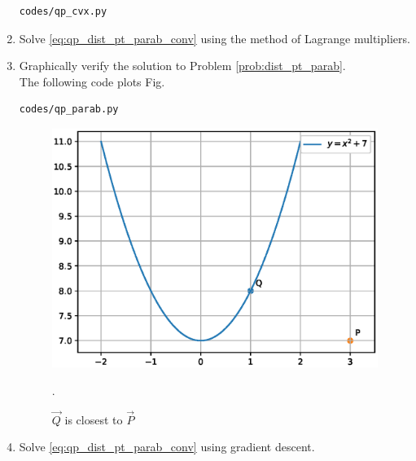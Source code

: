 \begin{enumerate}[label=\arabic*.,ref=\thesection.\theenumi]
\begin{lstlisting}
codes/qp_cvx.py
\end{lstlisting}

\item Solve \eqref{eq:qp_dist_pt_parab_conv} using the method of Lagrange multipliers.
\item Graphically verify the solution to Problem \ref{prob:dist_pt_parab}. 
\\
\solution 
The following code plots Fig. \label{fig:qp_parab}
%	
\begin{lstlisting}
codes/qp_parab.py
\end{lstlisting}

%
\begin{figure}[!ht]
\centering
\includegraphics[width=\columnwidth]{./figs/qp_parab.eps}
\caption{ $\vec{Q}$ is closest to $\vec{P}$}.
\label{fig:qp_parab}
\end{figure}
%
%
%	
\item Solve \eqref{eq:qp_dist_pt_parab_conv} using gradient descent.
%
\end{enumerate}
